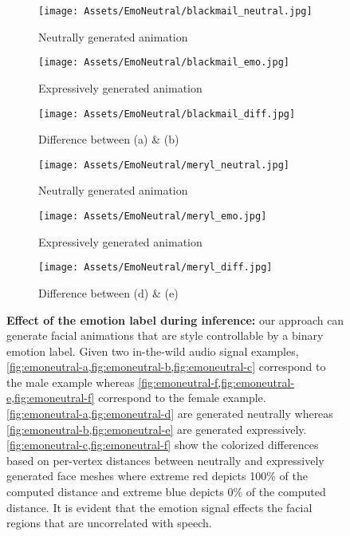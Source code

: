 \documentclass[10pt,twocolumn,letterpaper]{article}
\begin{document}
\begin{figure*}
  \centering
\begin{subfigure}{0.15\linewidth}
    \texttt{[image: Assets/EmoNeutral/blackmail\_neutral.jpg]}
    \caption{Neutrally generated animation}
    \label{fig:emoneutral-a}
  \end{subfigure}
  \hfill
  \begin{subfigure}{0.15\linewidth}
    \texttt{[image: Assets/EmoNeutral/blackmail\_emo.jpg]}
    \caption{Expressively generated animation}
    \label{fig:emoneutral-b}
  \end{subfigure}
  \hfill
  \begin{subfigure}{0.15\linewidth}
    \texttt{[image: Assets/EmoNeutral/blackmail\_diff.jpg]}
    \caption{Difference between (a) \& (b)}
    \label{fig:emoneutral-c}
  \end{subfigure}
  \hfill\begin{subfigure}{0.15\linewidth}
    \texttt{[image: Assets/EmoNeutral/meryl\_neutral.jpg]}
    \caption{Neutrally generated animation}
    \label{fig:emoneutral-d}
  \end{subfigure}
  \hfill\begin{subfigure}{0.15\linewidth}
    \texttt{[image: Assets/EmoNeutral/meryl\_emo.jpg]}
    \caption{Expressively generated animation}
    \label{fig:emoneutral-e}
  \end{subfigure}
  \hfill\begin{subfigure}{0.15\linewidth}
    \texttt{[image: Assets/EmoNeutral/meryl\_diff.jpg]}
    \caption{Difference between (d) \& (e)}
    \label{fig:emoneutral-f}
  \end{subfigure}
  \caption{\textbf{Effect of the emotion label during inference:} our approach can generate facial animations that are style controllable by a binary emotion label. Given two in-the-wild audio signal examples, \cref{fig:emoneutral-a,fig:emoneutral-b,fig:emoneutral-c} correspond to the male example whereas \cref{fig:emoneutral-f,fig:emoneutral-e,fig:emoneutral-f} correspond to the female example. \cref{fig:emoneutral-a,fig:emoneutral-d} are generated neutrally whereas \cref{fig:emoneutral-b,fig:emoneutral-e} are generated expressively. \cref{fig:emoneutral-c,fig:emoneutral-f} show the colorized differences based on per-vertex distances between neutrally and expressively generated face meshes where extreme red depicts 100\% of the computed distance and extreme blue depicts 0\% of the computed distance. It is evident that the emotion signal effects the facial regions that are uncorrelated with speech.}
  \label{fig:emoeffect}
\end{figure*}
\end{document}

